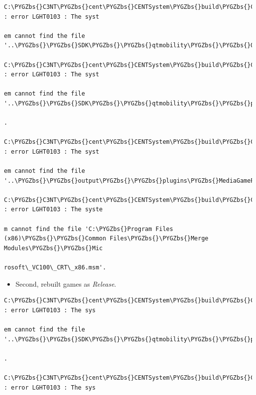 \documentclass[letterpaper,10pt,english]{sphinxmanual}
\def\PYGZbs{\char`\\}
\begin{document}
\begin{enumerate}
\begin{description}
\begin{itemize}
\end{itemize}

\begin{Verbatim}[commandchars=\\\{\}]
C:\PYGZbs{}C3NT\PYGZbs{}cent\PYGZbs{}CENTSystem\PYGZbs{}build\PYGZbs{}CENTInstaller.wxs(127) : error LGHT0103 : The syst

em cannot find the file '..\PYGZbs{}\PYGZbs{}SDK\PYGZbs{}\PYGZbs{}qtmobility\PYGZbs{}\PYGZbs{}QtMultimediaKit1.dll'.

C:\PYGZbs{}C3NT\PYGZbs{}cent\PYGZbs{}CENTSystem\PYGZbs{}build\PYGZbs{}CENTInstaller.wxs(140) : error LGHT0103 : The syst

em cannot find the file '..\PYGZbs{}\PYGZbs{}SDK\PYGZbs{}\PYGZbs{}qtmobility\PYGZbs{}\PYGZbs{}plugins\PYGZbs{}mediaservice\PYGZbs{}dsengine.dll'

.

C:\PYGZbs{}C3NT\PYGZbs{}cent\PYGZbs{}CENTSystem\PYGZbs{}build\PYGZbs{}CENTInstaller.wxs(159) : error LGHT0103 : The syst

em cannot find the file '..\PYGZbs{}\PYGZbs{}output\PYGZbs{}\PYGZbs{}plugins\PYGZbs{}MediaGamePlugin.dll'.

C:\PYGZbs{}C3NT\PYGZbs{}cent\PYGZbs{}CENTSystem\PYGZbs{}build\PYGZbs{}CENTInstaller.wxs(54) : error LGHT0103 : The syste

m cannot find the file 'C:\PYGZbs{}Program Files (x86)\PYGZbs{}\PYGZbs{}Common Files\PYGZbs{}\PYGZbs{}Merge Modules\PYGZbs{}\PYGZbs{}Mic

rosoft\_VC100\_CRT\_x86.msm'.
\end{Verbatim}
\begin{itemize}
\item {} 
Second, rebuilt games as \emph{Release}.

\end{itemize}

\begin{Verbatim}[commandchars=\\\{\}]
C:\PYGZbs{}C3NT\PYGZbs{}cent\PYGZbs{}CENTSystem\PYGZbs{}build\PYGZbs{}CENTInstaller.wxs(140) : error LGHT0103 : The sys

em cannot find the file '..\PYGZbs{}\PYGZbs{}SDK\PYGZbs{}\PYGZbs{}qtmobility\PYGZbs{}\PYGZbs{}plugins\PYGZbs{}mediaservice\PYGZbs{}dsengine.dll

.

C:\PYGZbs{}C3NT\PYGZbs{}cent\PYGZbs{}CENTSystem\PYGZbs{}build\PYGZbs{}CENTInstaller.wxs(159) : error LGHT0103 : The sys


\end{Verbatim}
\end{description}
\end{enumerate}
\end{document}
